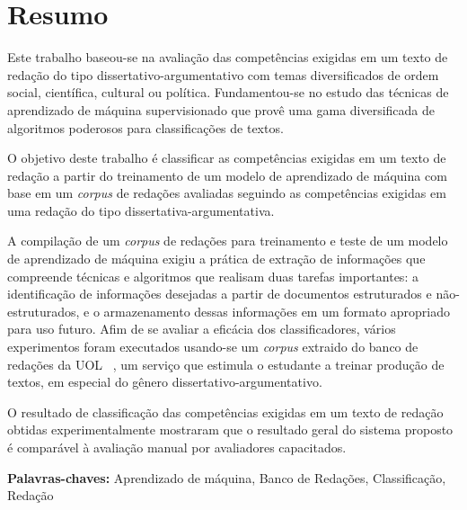 \chapter*{Resumo}

\noindent Este trabalho baseou-se na avaliação das competências exigidas em um 
texto de redação do tipo dissertativo-argumentativo com temas diversificados 
de ordem social, científica, cultural ou política. Fundamentou-se no estudo 
das técnicas de aprendizado de máquina supervisionado que provê uma gama 
diversificada de algoritmos poderosos para classificações de textos.

O objetivo deste trabalho é classificar as competências exigidas em um texto de 
redação a partir do treinamento de um modelo de aprendizado de máquina com
base em um \textit{corpus} de redações avaliadas seguindo as competências 
exigidas em uma redação do tipo dissertativa-argumentativa.

A compilação de um \textit{corpus} de redações para treinamento e teste de um 
modelo de aprendizado de máquina exigiu a prática de extração de informações 
que compreende técnicas e algoritmos que realisam duas tarefas importantes: a 
identificação de informações desejadas a partir de documentos estruturados e 
não-estruturados, e o armazenamento dessas informações em um formato apropriado 
para uso futuro. Afim de se avaliar a eficácia dos classificadores, 
vários experimentos foram executados usando-se um \textit{corpus} extraido do 
banco de redações da UOL ~\cite{uol_banco_redacoes:2017}, um serviço que 
estimula o estudante a treinar produção de textos, em especial do gênero 
dissertativo-argumentativo. 

O resultado de classificação das competências exigidas em um texto de redação 
obtidas experimentalmente mostraram que o resultado geral do sistema proposto é 
comparável à avaliação manual por avaliadores capacitados.

\textbf{Palavras-chaves:} Aprendizado de máquina, Banco de Redações, Classificação,
Redação